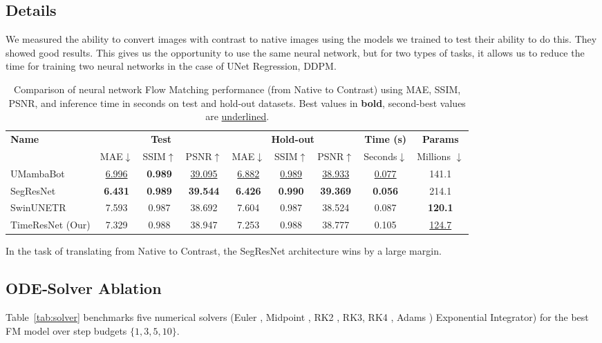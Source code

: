 \documentclass{article}
\begin{document}
\subsection{Details}
We measured the ability to convert images with contrast to native images using the models we trained to test their ability to do this. They showed good results. This gives us the opportunity to use the same neural network, but for two types of tasks, it allows us to reduce the time for training two neural networks in the case of UNet Regression, DDPM.
\begin{table}[h!]
\centering
\begin{tabular}{lcccccccc}
\toprule
\textbf{Name} 
  & \multicolumn{3}{c}{\textbf{Test}} 
  & \multicolumn{3}{c}{\textbf{Hold-out}} 
  & \textbf{Time (s)} & \textbf{Params} \\
\cmidrule(lr){2-4} \cmidrule(lr){5-7}
  & MAE$\downarrow$ & SSIM$\uparrow$ & PSNR$\uparrow$  
  & MAE$\downarrow$ & SSIM$\uparrow$ & PSNR$\uparrow$ 
  & Seconds$\downarrow$ & Millions $\downarrow$ \\
\midrule
UMambaBot         & \underline{6.996} & \textbf{0.989} & \underline{39.095} & \underline{6.882} & \underline{0.989} & \underline{38.933} & \underline{0.077} & 141.1 \\
SegResNet         & \textbf{6.431} & \textbf{0.989} & \textbf{39.544} & \textbf{6.426} & \textbf{0.990} & \textbf{39.369} & \textbf{0.056} & 214.1\\
SwinUNETR         & 7.593 & 0.987 & 38.692 & 7.604 & 0.987 & 38.524 & 0.087 & \textbf{120.1} \\
TimeResNet (Our)   & 7.329 & 0.988 & 38.947 & 7.253 & 0.988 & 38.777 & 0.105 & \underline{124.7} \\
\bottomrule
\end{tabular}
\caption{Comparison of neural network Flow Matching performance (from Native to Contrast) using MAE, SSIM, PSNR, and inference time in seconds on test and hold-out datasets. Best values in \textbf{bold}, second-best values are \underline{underlined}.}
\label{tab:flow_metrics_comparison}
\end{table}

In the task of translating from Native to Contrast, the SegResNet architecture wins by a large margin.

\subsection{ODE‑Solver Ablation}
Table~\ref{tab:solver} benchmarks five numerical solvers (Euler \citep{euler1769institutionum}, Midpoint \citep{10.1145/320831.320840}, RK2 \citep{Runge1895}, RK3, RK4 \citep{kutta1901beitrag}, Adams \citep{bashforth1883})
Exponential Integrator) for the best FM model over step budgets $\{1,3,5,10\}$.
\end{document}
